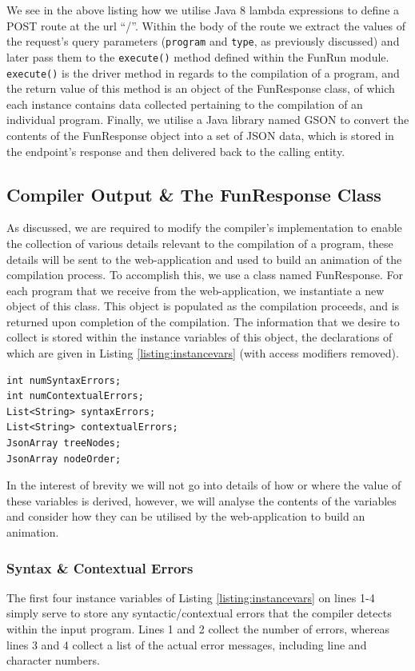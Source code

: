 \documentclass{l4proj}
\begin{document}
We see in the above listing how we utilise Java 8 lambda expressions to define a POST route at the url ``/''. Within the body of the route we extract the values of the request's query parameters (\texttt{program} and \texttt{type}, as previously discussed) and later pass them to the \texttt{execute()} method defined within the FunRun module. \texttt{execute()} is the driver method in regards to the compilation of a program, and the return value of this method is an object of the FunResponse class, of which each instance contains data collected pertaining to the compilation of an individual program. Finally, we utilise a Java library named GSON to convert the contents of the FunResponse object into a set of JSON data, which is stored in the endpoint's response and then delivered back to the calling entity.

\subsection{Compiler Output \& The FunResponse Class}
As discussed, we are required to modify the compiler's implementation to enable the collection of various details relevant to the compilation of a program, these details will be sent to the web-application and used to build an animation of the compilation process. To accomplish this, we use a class named FunResponse. For each program that we receive from the web-application, we instantiate a new object of this class. This object is populated as the compilation proceeds, and is returned upon completion of the compilation. The information that we desire to collect is stored within the instance variables of this object, the declarations of which are given in Listing \ref{listing:instancevars} (with access modifiers removed).
\begin{lstlisting}[language=myjava, caption=FunResponse instance variables, label=listing:instancevars]
int numSyntaxErrors;
int numContextualErrors;
List<String> syntaxErrors;
List<String> contextualErrors;
JsonArray treeNodes;
JsonArray nodeOrder;
\end{lstlisting}

In the interest of brevity we will not go into details of how or where the value of these variables is derived, however, we will analyse the contents of the variables and consider how they can be utilised by the web-application to build an animation. 

\subsubsection{Syntax \& Contextual Errors}
The first four instance variables of Listing \ref{listing:instancevars} on lines 1-4 simply serve to store any syntactic/contextual errors that the compiler detects within the input program. Lines 1 and 2 collect the number of errors, whereas lines 3 and 4 collect a list of the actual error messages, including line and character numbers.
\end{document}
